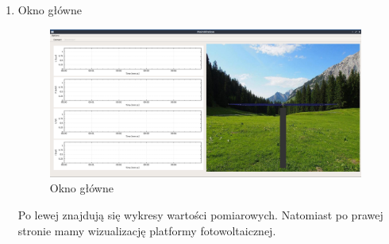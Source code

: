 \documentclass[10pt, a4paper]{article}
\begin{document}
		\begin{enumerate}
			\item Okno główne
				\begin{figure}[H]
					\centering
					\includegraphics[width=0.98\textwidth]{figures/okno_glowne1.png}
					\caption{Okno główne}
					\label{fig:okno_glowne1}
				\end{figure}
			Po lewej znajdują się wykresy wartości pomiarowych. Natomiast po prawej stronie mamy wizualizację platformy fotowoltaicznej.
					

\end{enumerate}
\end{document}
